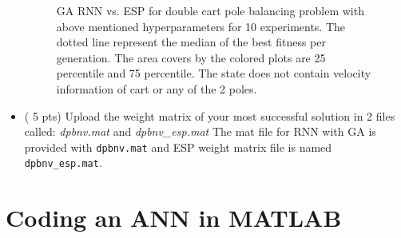 \documentclass{article}
\begin{document}
\begin{itemize}
\begin{figure}[htpb]
            \caption{GA RNN vs. ESP for double cart pole balancing problem with above mentioned hyperparameters for 10 experiments. The dotted line represent the median of the best fitness per generation. The area covers by the colored plots are 25 percentile and 75 percentile. The state does not contain velocity information of cart or any of the 2 poles.}
            \label{fig:}
        \end{figure}
	\item ( 5 pts) Upload the weight matrix of your most successful solution in 2 files called: \textit{dpbnv.mat} and \textit{dpbnv\_esp.mat}
        \color{blue}
        The mat file for RNN with GA is provided with \texttt{dpbnv.mat} and ESP weight matrix file is named \texttt{dpbnv_esp.mat}.
        \color{black}
\end{itemize}
\newpage
\section{Coding an ANN in MATLAB}
\end{document}
